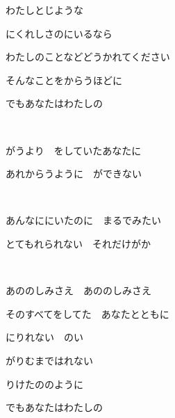 わたしとじような

にくれしさのにいるなら

わたしのことなどどうかれてください

そんなことをからうほどに

でもあなたはわたしの

~

がうより　をしていたあなたに

あれからうように　ができない

~

あんなににいたのに　まるでみたい

とてもれられない　それだけがか

~

あののしみさえ　あののしみさえ

そのすべてをしてた　あなたとともに

にりれない　のい

がりむまではれない

りけたののように

でもあなたはわたしの

